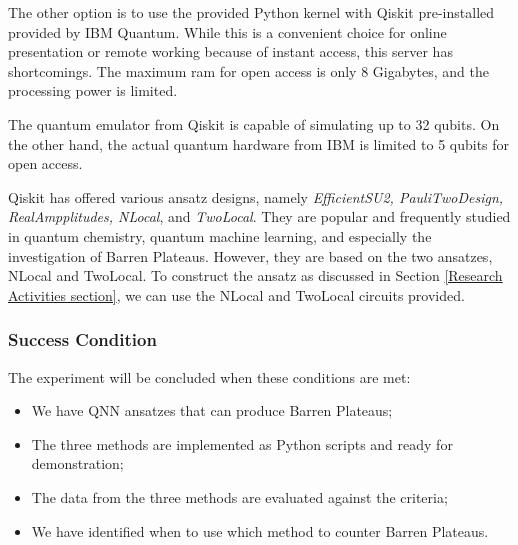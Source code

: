 The other option is to use the provided Python kernel with Qiskit pre-installed provided by IBM Quantum.
While this is a convenient choice for online presentation or remote working because of instant access, this server has shortcomings.
The maximum ram for open access is only 8 Gigabytes, and the processing power is limited.

The quantum emulator from Qiskit is capable of simulating up to 32 qubits.
On the other hand, the actual quantum hardware from IBM is limited to 5 qubits for open access.

Qiskit has offered various ansatz designs, namely \textit{EfficientSU2, PauliTwoDesign, RealAmpplitudes, NLocal}, and \textit{TwoLocal}.
They are popular and frequently studied in quantum chemistry, quantum machine learning, and especially the investigation of Barren Plateaus.
However, they are based on the two ansatzes, NLocal and TwoLocal.
To construct the ansatz as discussed in Section \ref{Research Activities section}, we can use the NLocal and TwoLocal circuits provided.


\subsubsection{Success Condition}
The experiment will be concluded when these conditions are met:
\begin{itemize}
    \item We have QNN ansatzes that can produce Barren Plateaus;
    \item The three methods are implemented as Python scripts and ready for demonstration;
    \item The data from the three methods are evaluated against the criteria;
    \item We have identified when to use which method to counter Barren Plateaus.
\end{itemize}